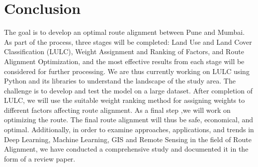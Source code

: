 %

\chapter{Conclusion}
The goal is to develop an optimal route alignment between Pune and Mumbai. As part of the process, three stages will be completed: Land Use and Land Cover Classification (LULC), Weight Assignment and Ranking of Factors, and Route Alignment Optimization, and the most effective results from each stage will be considered for further processing. We are thus currently working on LULC using Python and its libraries to understand the landscape of the study area. The challenge is to develop and test the model on a large dataset. After completion of LULC, we will use the suitable weight ranking method for assigning weights to different factors affecting route alignment. As a final step ,we will work on optimizing the route. The final route alignment will thus be safe, economical, and optimal. Additionally, in order to examine approaches, applications, and trends in Deep Learning, Machine Learning, GIS and Remote Sensing in the field of Route Alignment, we have conducted a comprehensive study and documented it in the form of a review paper. 

\begin{figure}[htbp]			%
\begin{center}
\label{circle}
\end{center}
\end{figure}

